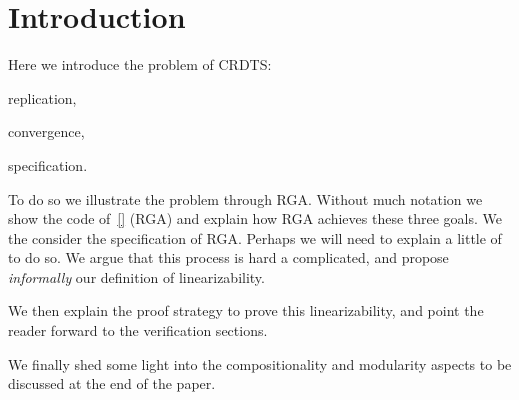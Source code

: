 \section{Introduction}
\label{sec:introduction}


Here we introduce the problem of CRDTS:
\begin{inparaenum}
\item replication, 
\item convergence, 
\item specification.
\end{inparaenum}
To do so we illustrate the problem through RGA. Without much notation
we show the code of~\autoref{} (RGA) and explain how RGA achieves
these three goals.
%
We the consider the specification of RGA. Perhaps we will need to
explain a little of~\cite{BurckhardtGYZ14} to do so.
%
We argue that this process is hard a complicated, and propose
\emph{informally} our definition of linearizability.

We then explain the proof strategy to prove this linearizability, and
point the reader forward to the verification sections. 

We finally shed some light into the compositionality and modularity
aspects to be discussed at the end of the paper. 


